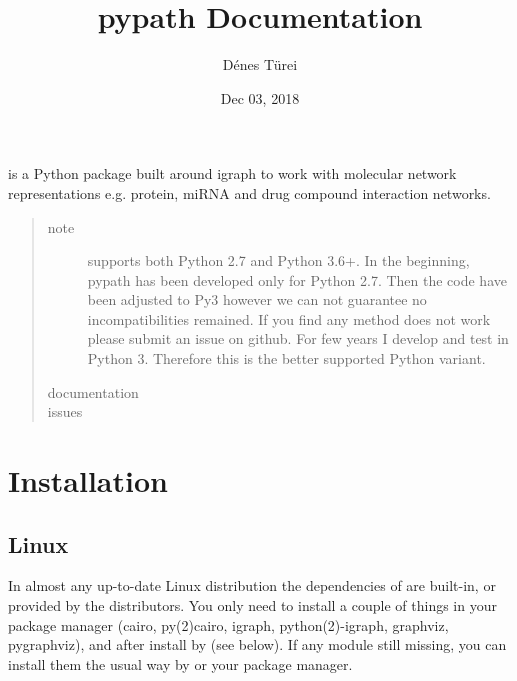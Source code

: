 \documentclass[letterpaper,10pt,english]{sphinxmanual}
\title{pypath Documentation}
\date{Dec 03, 2018}
\author{Dénes Türei}
\begin{document}
\maketitle
\sphinxtableofcontents
{}\label{\detokenize{index::doc}}


 is a Python package built around igraph to work with molecular
network representations e.g. protein, miRNA and drug compound interaction
networks.
\begin{quote}\begin{description}
\item[{note}] \leavevmode
{} supports both Python 2.7 and Python 3.6+. In the beginning,
pypath has been developed only for Python 2.7. Then the code have been
adjusted to Py3 however we can not guarantee no incompatibilities
remained. If you find any method does not work please submit an issue on
github. For few years I develop and test  in Python 3. Therefore
this is the better supported Python variant.

\item[{documentation}] \leavevmode
{}

\item[{issues}] \leavevmode
{}

\end{description}\end{quote}


\chapter{Installation}
\label{\detokenize{installation:installation}}\label{\detokenize{installation::doc}}

\section{Linux}
\label{\detokenize{installation:linux}}
In almost any up-to-date Linux distribution the dependencies of  are
built-in, or provided by the distributors. You only need to install a couple
of things in your package manager (cairo, py(2)cairo, igraph,
python(2)-igraph, graphviz, pygraphviz), and after install  by 
(see below). If any module still missing, you can install them the usual way
by  or your package manager.
\end{document}
